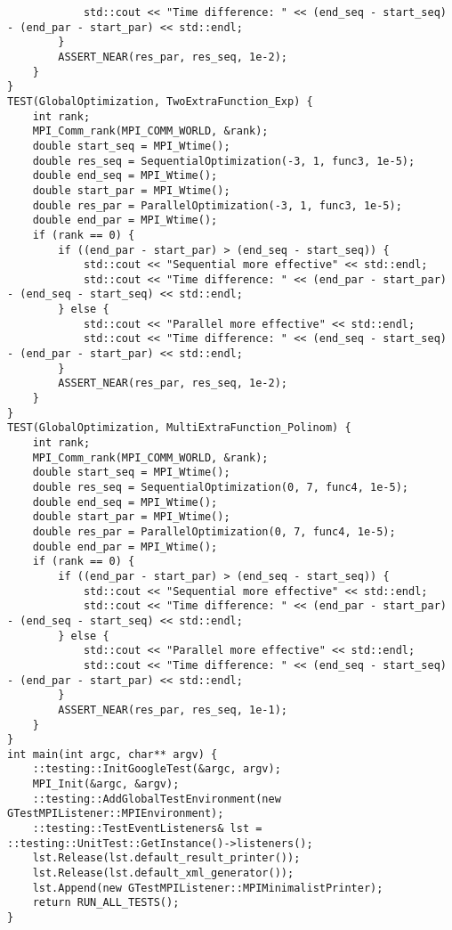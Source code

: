 \documentclass{report}
\begin{document}
\begin{lstlisting}
            std::cout << "Time difference: " << (end_seq - start_seq) - (end_par - start_par) << std::endl;
        }
        ASSERT_NEAR(res_par, res_seq, 1e-2);
    }
}
TEST(GlobalOptimization, TwoExtraFunction_Exp) {
    int rank;
    MPI_Comm_rank(MPI_COMM_WORLD, &rank);
    double start_seq = MPI_Wtime();
    double res_seq = SequentialOptimization(-3, 1, func3, 1e-5);
    double end_seq = MPI_Wtime();
    double start_par = MPI_Wtime();
    double res_par = ParallelOptimization(-3, 1, func3, 1e-5);
    double end_par = MPI_Wtime();
    if (rank == 0) {
        if ((end_par - start_par) > (end_seq - start_seq)) {
            std::cout << "Sequential more effective" << std::endl;
            std::cout << "Time difference: " << (end_par - start_par) - (end_seq - start_seq) << std::endl;
        } else {
            std::cout << "Parallel more effective" << std::endl;
            std::cout << "Time difference: " << (end_seq - start_seq) - (end_par - start_par) << std::endl;
        }
        ASSERT_NEAR(res_par, res_seq, 1e-2);
    }
}
TEST(GlobalOptimization, MultiExtraFunction_Polinom) {
    int rank;
    MPI_Comm_rank(MPI_COMM_WORLD, &rank);
    double start_seq = MPI_Wtime();
    double res_seq = SequentialOptimization(0, 7, func4, 1e-5);
    double end_seq = MPI_Wtime();
    double start_par = MPI_Wtime();
    double res_par = ParallelOptimization(0, 7, func4, 1e-5);
    double end_par = MPI_Wtime();
    if (rank == 0) {
        if ((end_par - start_par) > (end_seq - start_seq)) {
            std::cout << "Sequential more effective" << std::endl;
            std::cout << "Time difference: " << (end_par - start_par) - (end_seq - start_seq) << std::endl;
        } else {
            std::cout << "Parallel more effective" << std::endl;
            std::cout << "Time difference: " << (end_seq - start_seq) - (end_par - start_par) << std::endl;
        }
        ASSERT_NEAR(res_par, res_seq, 1e-1);
    }
}
int main(int argc, char** argv) {
    ::testing::InitGoogleTest(&argc, argv);
    MPI_Init(&argc, &argv);
    ::testing::AddGlobalTestEnvironment(new GTestMPIListener::MPIEnvironment);
    ::testing::TestEventListeners& lst = ::testing::UnitTest::GetInstance()->listeners();
    lst.Release(lst.default_result_printer());
    lst.Release(lst.default_xml_generator());
    lst.Append(new GTestMPIListener::MPIMinimalistPrinter);
    return RUN_ALL_TESTS();
}
\end{lstlisting}
\end{document}
